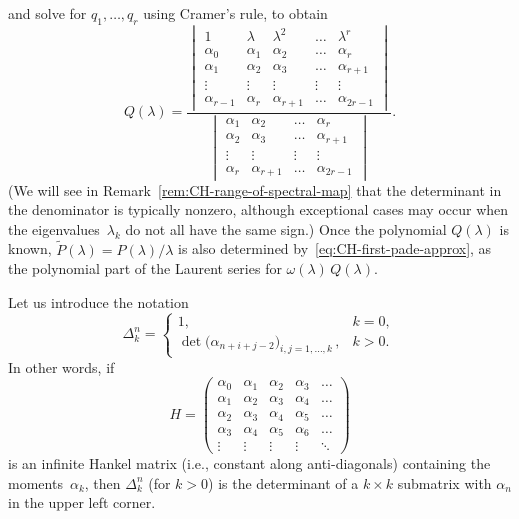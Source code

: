 \documentclass[10pt,a4paper]{article} \pdfoutput=1 
\begin{document}
and solve for $q_1, \dots, q_r$ using Cramer's rule, to obtain
\begin{equation}
  \label{eq:CH-Qn-even-det}
  Q(\lambda) =
  \frac{
    \begin{vmatrix}
      1 & \lambda & \lambda^2 & \dots & \lambda^r \\
      \alpha_0 & \alpha_1 & \alpha_2 & \dots & \alpha_r \\
      \alpha_1 & \alpha_2 & \alpha_3 & \dots & \alpha_{r+1} \\
      \vdots & \vdots & \vdots & \vdots & \vdots \\
      \alpha_{r-1} & \alpha_r & \alpha_{r+1} & \dots & \alpha_{2r-1}
    \end{vmatrix}
  }{
    \begin{vmatrix}
      \alpha_1 & \alpha_2 & \dots & \alpha_r \\
      \alpha_2 & \alpha_3 & \dots & \alpha_{r+1} \\
      \vdots & \vdots & \vdots & \vdots \\
      \alpha_r & \alpha_{r+1} & \dots & \alpha_{2r-1}
    \end{vmatrix}
  }
  .
\end{equation}
(We will see in Remark~\ref{rem:CH-range-of-spectral-map}
that the determinant in the denominator is typically nonzero,
although exceptional cases may occur when the eigenvalues~$\lambda_k$ do not all have the same sign.)
Once the polynomial $Q(\lambda)$ is known,
$\widetilde P(\lambda) = P(\lambda)/\lambda$ is also determined by~\eqref{eq:CH-first-pade-approx},
as the polynomial part of the Laurent series for $\omega(\lambda) \, Q(\lambda)$.

Let us introduce the notation
\begin{equation}
  \label{eq:CH-def-Hankel-det}
  \Delta_k^n =
  \begin{cases}
    1
    , & k=0
    ,\\
    \det \bigl( \alpha_{n+i+j-2} \bigr)_{i,j=1,\dots,k}
    \, , & k>0
    .
  \end{cases}
\end{equation}
In other words, if
\begin{equation}
  H =
  \begin{pmatrix}
    \alpha_0 & \alpha_1 & \alpha_2 & \alpha_3 & \dots \\
    \alpha_1 & \alpha_2 & \alpha_3 & \alpha_4 & \dots \\
    \alpha_2 & \alpha_3 & \alpha_4 & \alpha_5 & \dots \\
    \alpha_3 & \alpha_4 & \alpha_5 & \alpha_6 & \dots \\
    \vdots & \vdots & \vdots & \vdots & \ddots
  \end{pmatrix}
\end{equation}
is an infinite Hankel matrix
(i.e., constant along anti-diagonals)
containing the moments~$\alpha_k$,
then $\Delta_k^n$ (for $k>0$) is the determinant of a $k\times k$ submatrix
with $\alpha_n$ in the upper left corner.
\end{document}
